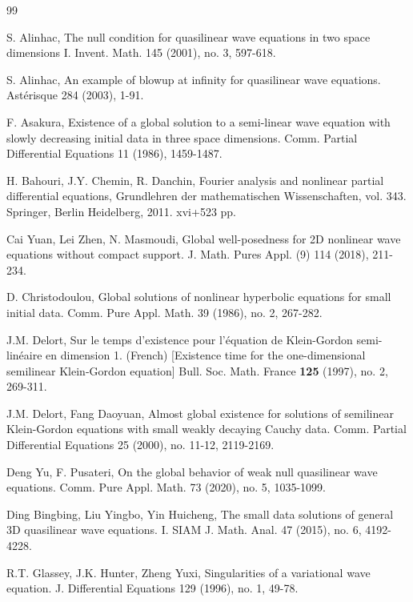 \documentclass[11pt,twoside]{article}
\theoremstyle{plain}
\theoremstyle{definition}
\numberwithin{equation}{section}
\begin{document}
\begin{thebibliography}{99}

 S. Alinhac, The null condition for quasilinear wave equations in two space dimensions I. Invent. Math. 145 (2001), no. 3, 597-618.

 S. Alinhac, An example of blowup at infinity for quasilinear wave equations. Ast\'erisque 284 (2003), 1-91.


 F. Asakura, Existence of a global solution to a semi-linear wave equation with slowly
decreasing initial data in three space dimensions. Comm. Partial Differential Equations 11 (1986), 1459-1487.


 H. Bahouri, J.Y. Chemin, R. Danchin, Fourier analysis and nonlinear partial differential equations, Grundlehren der mathematischen Wissenschaften, vol. 343. Springer, Berlin Heidelberg, 2011. xvi+523 pp.

 Cai Yuan, Lei Zhen, N. Masmoudi, Global well-posedness for 2D nonlinear wave equations without compact support.
 J. Math. Pures Appl. (9) 114 (2018), 211-234.

 D. Christodoulou, Global solutions of nonlinear hyperbolic equations for small initial data.
 Comm. Pure Appl. Math. 39 (1986), no. 2, 267-282.

 J.M. Delort, Sur le temps d'existence pour l'\'{e}quation de Klein-Gordon semi-lin\'{e}aire en dimension 1.
(French) [Existence time for the one-dimensional semilinear Klein-Gordon equation] Bull. Soc. Math. France \textbf{125} (1997),
no. 2, 269-311.



 J.M. Delort, Fang Daoyuan, Almost global existence for solutions of semilinear Klein-Gordon equations with small weakly decaying Cauchy data. Comm. Partial Differential Equations 25 (2000), no. 11-12, 2119-2169.

 Deng Yu, F. Pusateri, On the global behavior of weak null quasilinear wave equations.
Comm. Pure Appl. Math. 73 (2020), no. 5, 1035-1099.

 Ding Bingbing, Liu Yingbo, Yin Huicheng, The small data solutions of general 3D quasilinear wave equations. I.
SIAM J. Math. Anal. 47 (2015), no. 6, 4192-4228.

 R.T. Glassey, J.K. Hunter,  Zheng Yuxi, Singularities of a variational wave equation.
J. Differential Equations 129 (1996), no. 1, 49-78.


\end{thebibliography}
\end{document}
